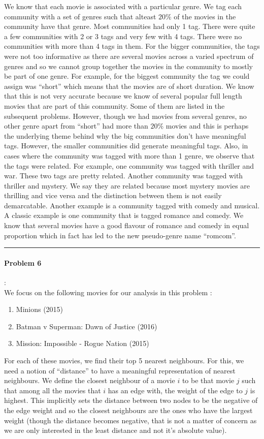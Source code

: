 \documentclass{article}
\begin{document}
We know that each movie is associated with a particular genre. We tag each community with a set of genres such that
alteast $20\%$ of the movies in the community have that genre. Most communities had only 1 tag. There were quite a few communities
with 2 or 3 tags and very few with 4 tags. There were no communities with more than 4 tags in them.
For the bigger communities, the tags were not too informative as there are several movies across a varied spectrum
of genres and so we cannot group together the movies in the community to mostly be part of one genre. For example, for the 
biggest community the tag we could assign was ``short'' which means that the movies are of short duration. We know that this 
is not very accurate because we know of several popular full length movies that are part of this community. Some of them
are listed in the subsequent problems. However, though we had movies from several genres, no other genre apart from ``short'' 
had more than $20\%$ movies and this is perhaps the underlying theme behind why the big communities don't have meaningful tags.  
However, the smaller communities did generate meaningful tags. Also, in cases where the community was tagged with more than
1 genre, we observe that the tags were related. For example, one community was tagged with thriller and war. These two tags are
pretty related. Another community was tagged with thriller and mystery. We say they are related because most mystery movies
are thrilling and vice versa and the distinction between them is not easily demarcatable. Another example is a community tagged
with comedy and musical. A classic example is one community that is tagged romance and comedy. We know that several movies
have a good flavour of romance and comedy in equal proportion which in fact has led to the new pseudo-genre name ``romcom''. 

\hrule

\paragraph{Problem 6}:\\
We focus on the following movies for our analysis in this problem :
\begin{enumerate}
 \item 
 Minions (2015)
 \item
 Batman v Superman: Dawn of Justice (2016)
 \item
 Mission: Impossible - Rogue Nation (2015)
\end{enumerate}
For each of these movies, we find their top 5 nearest neighbours. For this, we need a notion of
``distance'' to have a meaningful representation of nearest neighbours. We define the closest neighbour of a movie $i$
to be that movie $j$ such that among all the movies that $i$ has an edge with, the weight of the edge to $j$ is highest.
This implicitly sets the distance between two nodes to be the negative of the edge weight and so the closest neighbours are
the ones who have the largest weight (though the distance becomes negative, that is not a matter of concern as we are only 
interested in the least distance and not it's absolute value).
\end{document}
